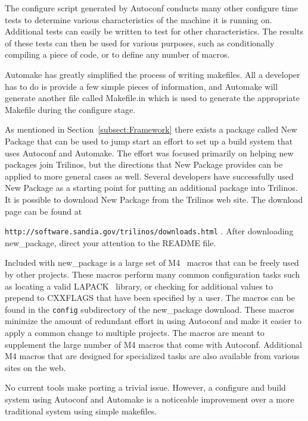 \documentclass[12pt,relax]{article}
\newcommand{\InlineDirectory}[1]{
  {\hspace{0.01 in}} {\tt #1} {\hspace{0.01 in}}}
\begin{document}
The configure script generated by Autoconf conducts many other configure 
time tests to determine various 
characteristics of the machine it is running on.  Additional tests can 
easily be written to test for other characteristics.  The results of these 
tests can then be used for various purposes, such as conditionally compiling 
a piece of code, or to define any number of macros.

Automake has greatly simplified the process of writing makefiles.  All a 
developer has to do is provide a few simple pieces of information, and 
Automake will generate another file called Makefile.in which is used to 
generate the appropriate Makefile during the configure stage.

As mentioned in Section~\ref{subsect:Framework} there exists a package called 
New Package that can be used to jump start an effort to set up a 
build system that uses Autoconf and Automake.  The effort was focused 
primarily on helping new packages join Trilinos, but the directions that 
New Package provides can be applied to more general cases as well.  Several
developers have successfully used New Package as a starting point for 
putting an additional
package into Trilinos.  It is possible to download New Package from the 
Trilinos web site.  The download page can be found at \newline 
\InlineDirectory{http://software.sandia.gov/trilinos/downloads.html}.  After
downloading new\_package, direct your attention to the README file.

Included with new\_package is a large set of M4~\cite{M4} macros that can 
be freely used by other projects.  These macros perform many common 
configuration tasks such as locating a valid LAPACK~\cite{lapack} library, 
or checking for additional values to prepend to CXXFLAGS that have been 
specified by a user.  The macros can be found in the \InlineDirectory{config}
subdirectory of the new\_package download.  These macros minimize the amount of
redundant effort in using Autoconf and make it easier to apply a common change 
to multiple projects.  The macros are meant to supplement the large number of 
M4 macros that come with Autoconf.  Additional M4 macros that are designed for 
specialized tasks are also available from various sites on the web.

No current tools make porting a trivial issue.  However, a 
configure and build system using Autoconf and Automake is a 
noticeable improvement over a more traditional system using simple makefiles.
\end{document}

